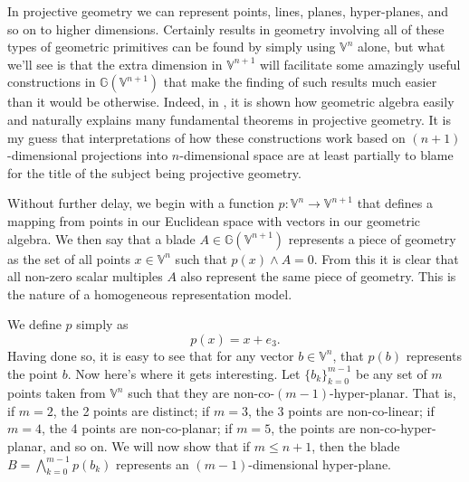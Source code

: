 \documentclass[12pt]{article}
\newcommand{\G}{\mathbb{G}}
\newcommand{\V}{\mathbb{V}}
\begin{document}
In projective geometry we can represent points, lines, planes, hyper-planes, and so on to higher dimensions.
Certainly results in geometry involving all of these types of geometric 
primitives can be found by simply using $\V^n$ alone, but what we'll see is that the extra dimension
in $\V^{n+1}$ will facilitate some amazingly useful constructions in $\G(\V^{n+1})$ that
make the finding of such results much easier than it would be otherwise.  Indeed, in
\cite{hestenes91}, it is shown how geometric algebra easily and naturally explains many
fundamental theorems in projective geometry.
It is my guess that interpretations of how these constructions work based on $(n+1)$-dimensional
projections into $n$-dimensional space are at least partially to blame for the title of the
subject being projective geometry.

Without further delay, we begin with a function $p:\V^n\to\V^{n+1}$ that defines
a mapping from points in our Euclidean space with vectors in our geometric algebra.
We then say that a blade $A\in\G(\V^{n+1})$ represents a piece of geometry as
the set of all points $x\in\V^n$ such that $p(x)\wedge A=0$.  From this it is clear
that all non-zero scalar multiples $A$ also represent the same piece of geometry.
This is the nature of a homogeneous representation model.

We define $p$ simply as
\begin{equation*}
p(x) = x + e_3.
\end{equation*}
Having done so, it is easy to see that for any vector $b\in\V^n$, that $p(b)$
represents the point $b$.  Now here's where it gets interesting.  Let $\{b_k\}_{k=0}^{m-1}$
be any set of $m$ points taken from $\V^n$ such that they are non-co-$(m-1)$-hyper-planar.
That is, if $m=2$, the 2 points are distinct; if $m=3$, the 3 points are non-co-linear; if
$m=4$, the 4 points are non-co-planar; if $m=5$, the points are non-co-hyper-planar, and so on.
We will now show that if $m\leq n+1$, then the blade $B=\bigwedge_{k=0}^{m-1}p(b_k)$ represents an
$(m-1)$-dimensional hyper-plane.
\end{document}
